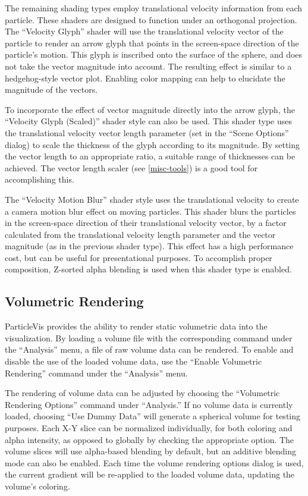 The remaining shading types employ translational velocity information from each particle.  These shaders are designed to function under an orthogonal projection.  The ``Velocity Glyph'' shader will use the translational velocity vector of the particle to render an arrow glyph that points in the screen-space direction of the particle's motion.  This glyph is inscribed onto the surface of the sphere, and does not take the vector magnitude into account.  The resulting effect is similar to a hedgehog-style vector plot.  Enabling color mapping can help to elucidate the magnitude of the vectors.

To incorporate the effect of vector magnitude directly into the arrow glyph, the ``Velocity Glyph (Scaled)'' shader style can also be used.  This shader type uses the translational velocity vector length parameter (set in the ``Scene Options'' dialog) to scale the thickness of the glyph according to its magnitude.  By setting the vector length to an appropriate ratio, a suitable range of thicknesses can be achieved.  The vector length scaler (see \ref{misc-tools}) is a good tool for accomplishing this.

The ``Velocity Motion Blur'' shader style uses the translational velocity to create a camera motion blur effect on moving particles.  This shader blurs the particles in the screen-space direction of their translational velocity vector, by a factor calculated from the translational velocity length parameter and the vector magnitude (as in the previous shader type).  This effect has a high performance cost, but can be useful for presentational purposes.  To accomplish proper composition, Z-sorted alpha blending is used when this shader type is enabled.

\subsection{Volumetric Rendering}

ParticleVis provides the ability to render static volumetric data into the visualization.  By loading a volume file with the corresponding command under the ``Analysis'' menu, a file of raw volume data can be rendered.  To enable and disable the use of the loaded volume data, use the ``Enable Volumetric Rendering'' command under the ``Analysis'' menu.

The rendering of volume data can be adjusted by choosing the ``Volumetric Rendering Options'' command under ``Analysis.''  If no volume data is currently loaded, choosing ``Use Dummy Data'' will generate a spherical volume for testing purposes.  Each X-Y slice can be normalized individually, for both coloring and alpha intensity, as opposed to globally by checking the appropriate option.  The volume slices will use alpha-based blending by default, but an additive blending mode can also be enabled.  Each time the volume rendering options dialog is used, the current gradient will be re-applied to the loaded volume data, updating the volume's coloring.

